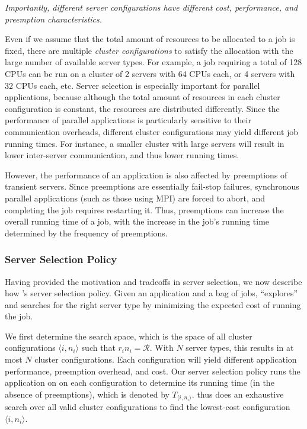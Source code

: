 \noindent \emph{Importantly, different server configurations have different cost, performance, and preemption characteristics. }


Even if we assume that the total amount of resources to be allocated to a job is fixed, there are multiple \emph{cluster configurations} to satisfy the allocation with the large number of available server types. 
For example, a job requiring a total of 128 CPUs can be run on a cluster of 2 servers with 64 CPUs each, or 4 servers with 32 CPUs each, etc. 
Server selection is especially important for parallel applications, because although the total amount of resources in each cluster configuration is constant, the resources are distributed differently. 
Since the performance of parallel applications is particularly sensitive to their communication overheads, different cluster configurations may yield different job running times.
For instance, a smaller cluster with large servers will result in lower inter-server communication, and thus lower running times. 

However, the performance of an application is also affected by preemptions of transient servers.
Since preemptions are essentially fail-stop failures, synchronous parallel applications (such as those using MPI) are forced to abort, and completing the job requires restarting it.
Thus, preemptions can increase the overall running time of a job, with the increase in the job's running time determined by the frequency of preemptions.


\subsubsection{Server Selection Policy}

Having provided the motivation and tradeoffs in server selection, we now describe how \sysname's server selection policy. 
Given an application and a bag of jobs, \sysname ``explores'' and searches for the right server type by minimizing the expected cost of running the job.

We first determine the search space, which is the space of all cluster configurations $\langle i,n_i \rangle$ such that $r_i n_i = \mathcal{R}$. With $N$ server types, this results in at most $N$ cluster configurations.
Each configuration will yield different application performance, preemption overhead, and cost.
Our server selection policy runs the application on on each configuration to determine its running time (in the absence of preemptions), which is denoted by $T_{\langle i,n_i \rangle}$. 
\sysname thus does an exhaustive search over all valid cluster configurations to find the lowest-cost configuration $\langle i, n_i \rangle$. 

